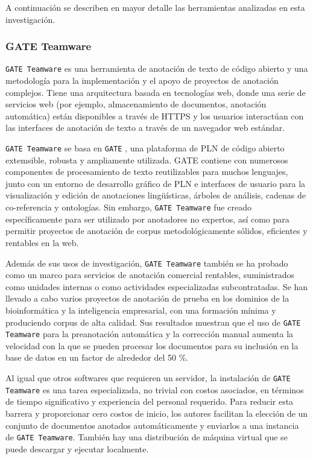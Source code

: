 A continuación se describen en mayor detalle las herramientas analizadas en esta investigación.

\subsubsection*{GATE Teamware}

\texttt{GATE Teamware} es una herramienta de anotación de texto de código abierto y una metodología para la implementación y el apoyo de proyectos de anotación complejos.
Tiene una arquitectura basada en tecnologías web, donde una serie de servicios web (por ejemplo, almacenamiento de documentos, anotación automática) están disponibles a través de HTTPS y los usuarios interactúan con las interfaces de anotación de texto a través de un navegador web estándar.

\texttt{GATE Teamware} se basa en \texttt{GATE} \cite{cunningham2011text}, una plataforma de PLN de código abierto extemsible, robusta y ampliamente utilizada.
GATE contiene con numerosos componentes de procesamiento de texto reutilizables para muchos lenguajes, junto con un entorno de desarrollo gráfico de PLN e interfaces de usuario para la visualización y edición de anotaciones lingüísticas, árboles de análisis, cadenas de co-referencia y ontologías.
Sin embargo, \texttt{GATE Teamware} fue creado específicamente para ser utilizado por anotadores no expertos, así como para permitir proyectos de anotación de corpus metodológicamente sólidos, eficientes y rentables en la web.

Además de sus usos de investigación, \texttt{GATE Teamware} también se ha probado como un marco para servicios de anotación comercial rentables, suministrados como unidades internas o como actividades especializadas subcontratadas.
Se han llevado a cabo varios proyectos de anotación de prueba en los dominios de la bioinformática y la inteligencia empresarial, con una formación mínima y produciendo corpus de alta calidad.
Sus resultados muestran que el uso de \texttt{GATE Teamware} para la preanotación automática y la corrección manual aumenta la velocidad con la que se pueden procesar los documentos para su inclusión en la base de datos en un factor de alrededor del 50 \%.

Al igual que otros softwares que requieren un servidor, la instalación de \texttt{GATE Teamware} es una tarea especializada, no trivial con costos asociados, en términos de tiempo significativo y experiencia del personal requerido.
Para reducir esta barrera y proporcionar cero costos de inicio, los autores facilitan la elección de un conjunto de documentos anotados automáticamente y enviarlos a una instancia de \texttt{GATE Teamware}.
También hay una distribución de máquina virtual que se puede descargar y ejecutar localmente.

